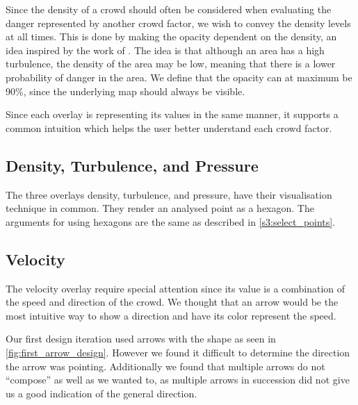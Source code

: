 Since the density of a crowd should often be considered when evaluating the danger represented by another crowd factor, we wish to convey the density levels at all times. This is done by making the opacity dependent on the density, an idea inspired by the work of \citet{wirz2012inferring}. The idea is that although an area has a high turbulence, the density of the area may be low, meaning that there is a lower probability of danger in the area. We define that the opacity can at maximum be 90\%, since the underlying map should always be visible.


Since each overlay is representing its values in the same manner, it supports a common intuition which helps the user better understand each crowd factor.

\subsection{Density, Turbulence, and Pressure}
The three overlays density, turbulence, and pressure, have their visualisation technique in common. They render an analysed point as a hexagon. The arguments for using hexagons are the same as described in \cref{s3:select_points}.


\subsection{Velocity}
The velocity overlay require special attention since its value is a combination of the speed and direction of the crowd. We thought that an arrow would be the most intuitive way to show a direction and have its color represent the speed.


Our first design iteration used arrows with the shape as seen in \cref{fig:first_arrow_design}. However we found it difficult to determine the direction the arrow was pointing. Additionally we found that multiple arrows do not \enquote{compose} as well as we wanted to, as multiple arrows in succession did not give us a good indication of the general direction.



